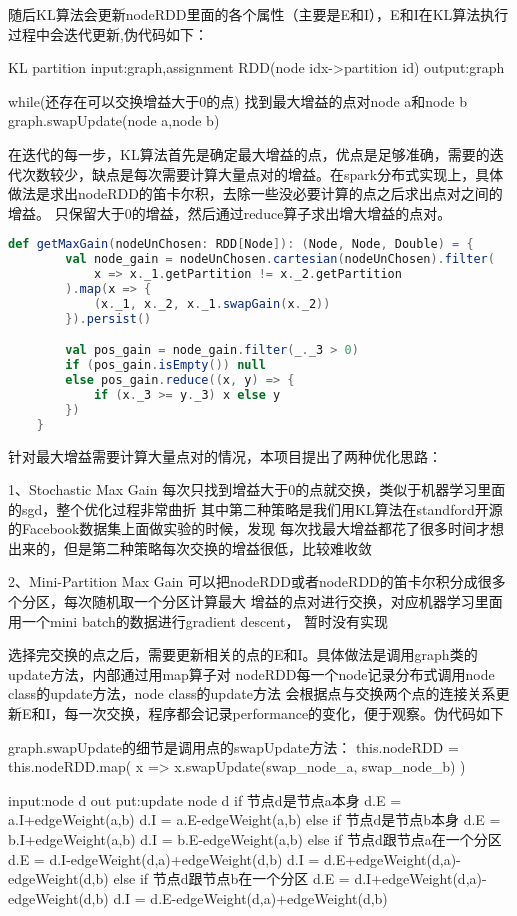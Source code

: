 随后KL算法会更新nodeRDD里面的各个属性（主要是E和I），E和I在KL算法执行过程中会迭代更新,伪代码如下：

KL partition
input:graph,assignment RDD(node idx->partition id)
output:graph

while(还存在可以交换增益大于0的点){
   找到最大增益的点对node a和node b
   graph.swapUpdate(node a,node b)
}

在迭代的每一步，KL算法首先是确定最大增益的点，优点是足够准确，需要的迭代次数较少，缺点是每次需要计算大量点对的增益。在spark分布式实现上，具体做法是求出nodeRDD的笛卡尔积，去除一些没必要计算的点之后求出点对之间的增益。
只保留大于0的增益，然后通过reduce算子求出增大增益的点对。
\begin{lstlisting}[language=Scala]
def getMaxGain(nodeUnChosen: RDD[Node]): (Node, Node, Double) = {
        val node_gain = nodeUnChosen.cartesian(nodeUnChosen).filter(
            x => x._1.getPartition != x._2.getPartition
        ).map(x => {
            (x._1, x._2, x._1.swapGain(x._2))
        }).persist()

        val pos_gain = node_gain.filter(_._3 > 0)
        if (pos_gain.isEmpty()) null
        else pos_gain.reduce((x, y) => {
            if (x._3 >= y._3) x else y
        })
    }
\end{lstlisting}

针对最大增益需要计算大量点对的情况，本项目提出了两种优化思路：

1、Stochastic Max Gain
每次只找到增益大于0的点就交换，类似于机器学习里面的sgd，整个优化过程非常曲折
其中第二种策略是我们用KL算法在standford开源的Facebook数据集上面做实验的时候，发现
每次找最大增益都花了很多时间才想出来的，但是第二种策略每次交换的增益很低，比较难收敛

2、Mini-Partition Max Gain
可以把nodeRDD或者nodeRDD的笛卡尔积分成很多个分区，每次随机取一个分区计算最大
增益的点对进行交换，对应机器学习里面用一个mini batch的数据进行gradient descent，
暂时没有实现

选择完交换的点之后，需要更新相关的点的E和I。具体做法是调用graph类的update方法，内部通过用map算子对
nodeRDD每一个node记录分布式调用node class的update方法，node class的update方法
会根据点与交换两个点的连接关系更新E和I，每一次交换，程序都会记录performance的变化，便于观察。伪代码如下

graph.swapUpdate的细节是调用点的swapUpdate方法：
this.nodeRDD = this.nodeRDD.map(
            x => x.swapUpdate(swap_node_a, swap_node_b)
        )

input:node d
out put:update node d
if 节点d是节点a本身
    d.E = a.I+edgeWeight(a,b)
    d.I = a.E-edgeWeight(a,b)
else if 节点d是节点b本身
    d.E = b.I+edgeWeight(a,b)
    d.I = b.E-edgeWeight(a,b)
else if 节点d跟节点a在一个分区
    d.E = d.I-edgeWeight(d,a)+edgeWeight(d,b)
    d.I = d.E+edgeWeight(d,a)-edgeWeight(d,b)
else if 节点d跟节点b在一个分区
    d.E = d.I+edgeWeight(d,a)-edgeWeight(d,b)
    d.I = d.E-edgeWeight(d,a)+edgeWeight(d,b)

